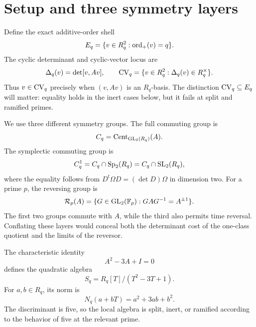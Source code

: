 \documentclass[11pt]{article}
\theoremstyle{definition}
\theoremstyle{remark}
\begin{document}
\section{Setup and three symmetry layers}
\label{sec:setup}

Define the exact additive-order shell
\begin{equation}
  E_q=\{v\in R_q^2:\operatorname{ord}_+(v)=q\}.
  \label{eq:exact-shell}
\end{equation}
The cyclic determinant and cyclic-vector locus are
\begin{equation}
  \Delta_q(v)=\det[v,Av],
  \qquad
  \mathrm{CV}_q=\{v\in R_q^2:\Delta_q(v)\in R_q^\times\}.
  \label{eq:cyclic-locus}
\end{equation}
Thus \(v\in\mathrm{CV}_q\) precisely when \((v,Av)\) is an \(R_q\)-basis.
The distinction \(\mathrm{CV}_q\subseteq E_q\) will matter: equality holds in the
inert cases below, but it fails at split and ramified primes.

We use three different symmetry groups.  The full commuting group is
\begin{equation}
  C_q=\operatorname{Cent}_{\mathrm{GL}_2(R_q)}(A).
  \label{eq:full-centralizer}
\end{equation}
The symplectic commuting group is
\begin{equation}
  C_q^1=C_q\cap\mathrm{Sp}_2(R_q)=C_q\cap\mathrm{SL}_2(R_q),
  \label{eq:symplectic-centralizer}
\end{equation}
where the equality follows from
\(D^t\Omega D=(\det D)\Omega\) in dimension two.  For a prime \(p\), the
reversing group is
\begin{equation}
  \mathcal R_p(A)=
  \{G\in\mathrm{GL}_2(\mathbb{F}_p):GAG^{-1}=A^{\pm1}\}.
  \label{eq:reversing-group}
\end{equation}
The first two groups commute with \(A\), while the third also permits time reversal.
Conflating these layers would conceal both the determinant cost of the
one-class quotient and the limits of the reversor.

The characteristic identity
\begin{equation}
  A^2-3A+I=0
  \label{eq:characteristic}
\end{equation}
defines the quadratic algebra
\begin{equation}
  S_q=R_q[T]/(T^2-3T+1).
  \label{eq:quadratic-algebra}
\end{equation}
For \(a,b\in R_q\), its norm is
\begin{equation}
  N_q(a+bT)=a^2+3ab+b^2.
  \label{eq:norm}
\end{equation}
The discriminant is five, so the local algebra is split, inert, or ramified
according to the behavior of five at the relevant prime.
\end{document}
